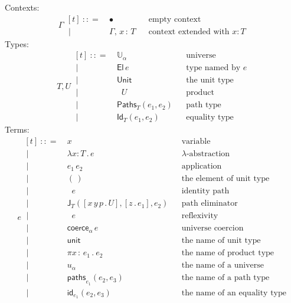 \documentclass{article}
\newcommand{\G}{\Gamma} %
\newcommand{\T}{T} %
\newcommand{\U}{U} %
\newcommand{\x}{x} %
\newcommand{\e}{e} %
\newcommand{\bnf}{\ \mathrel{{:}{:}{=}}\ }
\newcommand{\bnfor}{\ \mid\ \ }
\newcommand{\ctxempty}{\bullet} %
\newcommand{\ctxextend}[3]{#1,\, #2\, {:}\, #3} %
\newcommand{\Universe}[1]{\mathbb{U}_{#1}} %
\newcommand{\El}[1]{\mathsf{El}\, #1} %
\newcommand{\Unit}{\mathsf{Unit}} %
\newcommand{\Prod}[2]{\mathop{\textstyle\prod_{(#1 {:} #2)}}} %
\newcommand{\lam}[2]{\lambda #1 {:} #2 \,.\,} %
\newcommand{\app}[2]{#1\,#2} %
\newcommand{\abst}[2]{[#1 \,.\, #2]} %
\newcommand{\unitTerm}{(\,)} %
\newcommand{\coerce}[2]{\mathsf{coerce}_{#1} \, #2}
\newcommand{\PrEqual}[3]{\mathsf{Paths}_{#1}(#2,#3)} %
\newcommand{\JuEqual}[3]{\mathsf{Id}_{#1}(#2,#3)} %
\newcommand{\PrElim}[4]{\mathsf{J}_{#1}(#2, #3, #4)} %
\newcommand{\prRefl}[1]{\mathop{\mathsf{idpath}_{#1}}}  %
\newcommand{\juRefl}[1]{\mathop{\mathsf{refl}_{#1}}}    %
\newcommand{\nUnit}{\mathsf{unit}} %
\newcommand{\nProd}[2]{\pi #1\,{:}\,#2 \,.\ } %
\newcommand{\nUniverse}[1]{u_{#1}}  %
\newcommand{\nPrEqual}[3]{\mathsf{paths}_{#1}(#2,#3)} %
\newcommand{\nJuEqual}[3]{\mathsf{id}_{#1}(#2,#3)} %
\begin{document}
Contexts:
%
\begin{equation*}
  \G
  \begin{aligned}[t]
    \bnf   {}& \ctxempty & & \text{empty context}\\
    \bnfor {}& \ctxextend{\G}{\x}{\T} & & \text{context extended with $x : T$}
  \end{aligned}
\end{equation*}
%
Types:
%
\begin{equation*}
  \T, \U
  \begin{aligned}[t]
    \bnf   {}& \Universe{\alpha} & & \text{universe}\\
    \bnfor {}& \El{\e} & & \text{type named by $e$}\\
    \bnfor {}& \Unit & & \text{the unit type}\\
    \bnfor {}& \Prod{x}{\T} \U & & \text{product}\\
    \bnfor {}& \PrEqual{T}{\e_1}{\e_2} & & \text{path type}\\
    \bnfor {}& \JuEqual{T}{\e_1}{\e_2} & & \text{equality type}
  \end{aligned}
\end{equation*}
%
Terms:
%
\begin{equation*}
  \e
  \begin{aligned}[t]
    \bnf   {}&  \x   &&\text{variable} \\
    \bnfor {}&  \lam{\x}{\T} \e  &&\text{$\lambda$-abstraction} \\
    \bnfor {}&  \app{\e_1}{\e_2}  &&\text{application} \\
    \bnfor {}&  \unitTerm  &&\text{the element of unit type} \\
    \bnfor {}&  \prRefl{\T}{\e}  &&\text{identity path} \\
    \bnfor {}&  \PrElim{\T}{\abst{x\,y\,p}{\U}}{\abst{z}{\e_1}}{\e_2}  &&\text{path eliminator} \\
    \bnfor {}&  \juRefl{\T} \e  &&\text{reflexivity} \\
    \bnfor {}&  \coerce{\alpha}{\e}  &&\text{universe coercion} \\
    \bnfor {}&  \nUnit  &&\text{the name of unit type} \\
    \bnfor {}&  \nProd{\x}{\e_1} \e_2  &&\text{the name of product type} \\
    \bnfor {}&  \nUniverse{\alpha} &&\text{the name of a universe} \\
    \bnfor {}&  \nPrEqual{\e_1}{\e_2}{\e_3}  &&\text{the name of a path type} \\
    \bnfor {}&  \nJuEqual{\e_1}{\e_2}{\e_3}  &&\text{the name of an equality type}
  \end{aligned}
\end{equation*}
\end{document}
